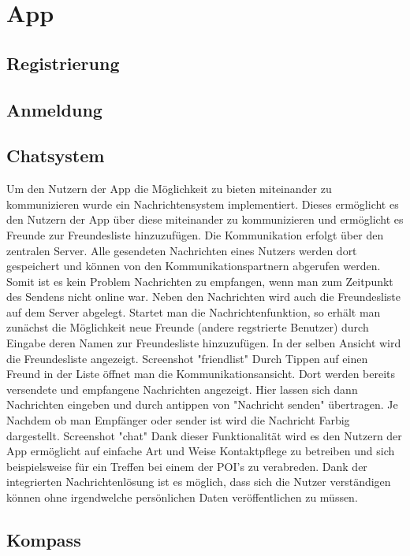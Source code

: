 \chapter{App}
\section{Registrierung}

\section{Anmeldung}

\section{Chatsystem}
Um den Nutzern der App die Möglichkeit zu bieten miteinander zu kommunizieren wurde ein Nachrichtensystem implementiert. Dieses ermöglicht es den Nutzern der App über diese miteinander zu kommunizieren und ermöglicht es Freunde zur Freundesliste hinzuzufügen. 
Die Kommunikation erfolgt über den zentralen Server. Alle gesendeten Nachrichten eines Nutzers werden dort gespeichert und können von den Kommunikationspartnern abgerufen werden. Somit ist es kein Problem Nachrichten zu empfangen, wenn man zum Zeitpunkt des Sendens nicht online war. Neben den Nachrichten wird auch die Freundesliste auf dem Server abgelegt.
Startet man die Nachrichtenfunktion, so erhält man zunächst die Möglichkeit neue Freunde (andere regstrierte Benutzer) durch Eingabe deren Namen zur Freundesliste hinzuzufügen. In der selben Ansicht wird die Freundesliste angezeigt. 
\TODO Screenshot "friendlist"
Durch Tippen auf einen Freund in der Liste öffnet man die Kommunikationsansicht. Dort werden bereits versendete und empfangene Nachrichten angezeigt. Hier lassen sich dann Nachrichten eingeben und durch antippen von "Nachricht senden" übertragen. Je Nachdem ob man Empfänger oder sender ist wird die Nachricht Farbig dargestellt.
\TODO Screenshot "chat"
Dank dieser Funktionalität wird es den Nutzern der App ermöglicht auf einfache Art und Weise Kontaktpflege zu betreiben und sich beispielsweise für ein Treffen bei einem der POI's zu verabreden. Dank der integrierten Nachrichtenlösung ist es möglich, dass sich die Nutzer verständigen können ohne irgendwelche persönlichen Daten veröffentlichen zu müssen.

\section{Kompass}

